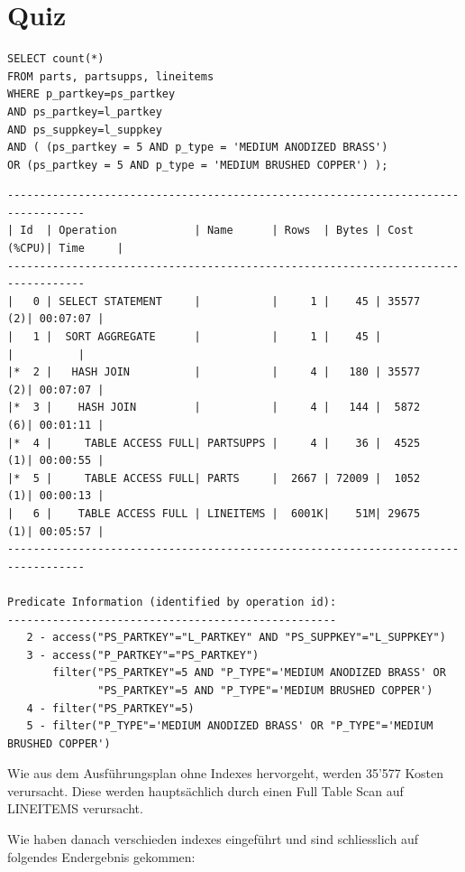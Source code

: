 \documentclass[10pt]{article}
\begin{document}
\section{Quiz}
\begin{lstlisting}[style=sql]
SELECT count(*)
FROM parts, partsupps, lineitems
WHERE p_partkey=ps_partkey
AND ps_partkey=l_partkey
AND ps_suppkey=l_suppkey
AND ( (ps_partkey = 5 AND p_type = 'MEDIUM ANODIZED BRASS')
OR (ps_partkey = 5 AND p_type = 'MEDIUM BRUSHED COPPER') );
\end{lstlisting}
\begin{lstlisting}[style=queryexecutionplan]
----------------------------------------------------------------------------------
| Id  | Operation            | Name      | Rows  | Bytes | Cost (%CPU)| Time     |
----------------------------------------------------------------------------------
|   0 | SELECT STATEMENT     |           |     1 |    45 | 35577   (2)| 00:07:07 |
|   1 |  SORT AGGREGATE      |           |     1 |    45 |            |          |
|*  2 |   HASH JOIN          |           |     4 |   180 | 35577   (2)| 00:07:07 |
|*  3 |    HASH JOIN         |           |     4 |   144 |  5872   (6)| 00:01:11 |
|*  4 |     TABLE ACCESS FULL| PARTSUPPS |     4 |    36 |  4525   (1)| 00:00:55 |
|*  5 |     TABLE ACCESS FULL| PARTS     |  2667 | 72009 |  1052   (1)| 00:00:13 |
|   6 |    TABLE ACCESS FULL | LINEITEMS |  6001K|    51M| 29675   (1)| 00:05:57 |
----------------------------------------------------------------------------------
 
Predicate Information (identified by operation id):
---------------------------------------------------
   2 - access("PS_PARTKEY"="L_PARTKEY" AND "PS_SUPPKEY"="L_SUPPKEY")
   3 - access("P_PARTKEY"="PS_PARTKEY")
       filter("PS_PARTKEY"=5 AND "P_TYPE"='MEDIUM ANODIZED BRASS' OR 
              "PS_PARTKEY"=5 AND "P_TYPE"='MEDIUM BRUSHED COPPER')
   4 - filter("PS_PARTKEY"=5)
   5 - filter("P_TYPE"='MEDIUM ANODIZED BRASS' OR "P_TYPE"='MEDIUM BRUSHED COPPER')
\end{lstlisting}
Wie aus dem Ausführungsplan ohne Indexes hervorgeht, werden 35'577 Kosten verursacht. Diese 
werden hauptsächlich durch einen Full Table Scan auf LINEITEMS verursacht.

Wie haben danach verschieden indexes eingeführt und sind schliesslich auf folgendes Endergebnis gekommen:
\end{document}
